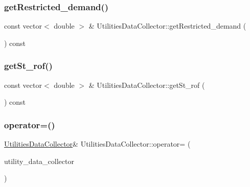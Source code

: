 \mbox{\label{classUtilitiesDataCollector_ad4a8d3c75aa8365d54abcb711ade26db_ad4a8d3c75aa8365d54abcb711ade26db}} 
\subsubsection{\texorpdfstring{get\+Restricted\+\_\+demand()}{getRestricted\_demand()}}
{\footnotesize\ttfamily const vector$<$ double $>$ \& Utilities\+Data\+Collector\+::get\+Restricted\+\_\+demand (\begin{DoxyParamCaption}{ }\end{DoxyParamCaption}) const}

\mbox{\label{classUtilitiesDataCollector_aa79cd7f8b1390abed3e6f85a20d503a0_aa79cd7f8b1390abed3e6f85a20d503a0}} 
\subsubsection{\texorpdfstring{get\+St\+\_\+rof()}{getSt\_rof()}}
{\footnotesize\ttfamily const vector$<$ double $>$ \& Utilities\+Data\+Collector\+::get\+St\+\_\+rof (\begin{DoxyParamCaption}{ }\end{DoxyParamCaption}) const}

\mbox{\label{classUtilitiesDataCollector_a805182c7f423290135a5c92844cdbb4a_a805182c7f423290135a5c92844cdbb4a}} 
\subsubsection{\texorpdfstring{operator=()}{operator=()}}
{\footnotesize\ttfamily \mbox{\hyperlink{classUtilitiesDataCollector}{Utilities\+Data\+Collector}}\& Utilities\+Data\+Collector\+::operator= (\begin{DoxyParamCaption}\item[{const \mbox{\hyperlink{classUtilitiesDataCollector}{Utilities\+Data\+Collector}} \&}]{utility\+\_\+data\+\_\+collector }\end{DoxyParamCaption})}

